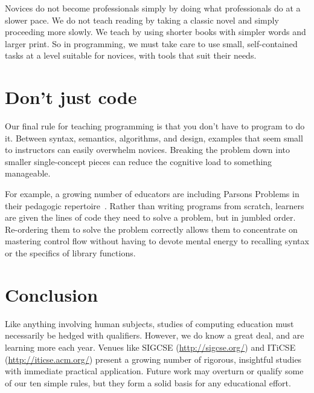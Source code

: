 \documentclass{article}
\begin{document}
Novices do not become professionals simply by doing what professionals do at a slower pace.
We do not teach reading by taking a classic novel and simply proceeding more slowly.
We teach by using shorter books with simpler words and larger print.
So in programming,
we must take care to use small, self-contained tasks at a level suitable for novices,
with tools that suit their needs.

\section{Don't just code}\label{not-just-code}

Our final rule for teaching programming is that you don't have to program to do it.
Between syntax, semantics, algorithms, and design,
examples that seem small to instructors can easily overwhelm novices.
Breaking the problem down into smaller single-concept pieces
can reduce the cognitive load to something manageable.

For example,
a growing number of educators are including Parsons Problems
in their pedagogic repertoire~\citep{parsons,morrison-parsons}.
Rather than writing programs from scratch,
learners are given the lines of code they need to solve a problem,
but in jumbled order.
Re-ordering them to solve the problem correctly
allows them to concentrate on mastering control flow
without having to devote mental energy to recalling syntax
or the specifics of library functions.

\section*{Conclusion}

Like anything involving human subjects,
studies of computing education must necessarily be hedged with qualifiers.
However,
we do know a great deal,
and are learning more each year.
Venues like SIGCSE (\url{http://sigcse.org/}) and ITiCSE (\url{http://iticse.acm.org/})
present a growing number of rigorous, insightful studies
with immediate practical application.
Future work may overturn or qualify some of our ten simple rules,
but they form a solid basis for any educational effort.



\end{document}
